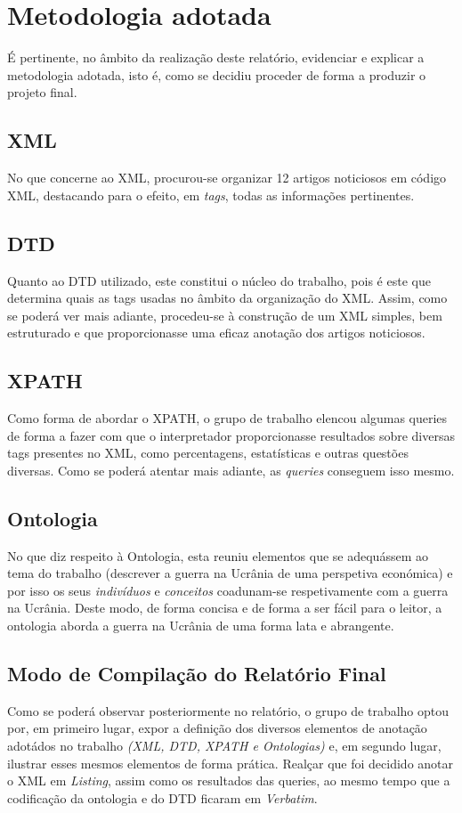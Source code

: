 \documentclass[12pt]{report}
\begin{document}
\chapter{Metodologia adotada}
É pertinente, no âmbito da realização deste relatório, evidenciar e explicar a metodologia adotada, isto é, como se decidiu proceder de forma a produzir o projeto final.

\section{XML}
No que concerne ao XML, procurou-se organizar 12 artigos noticiosos em código XML, destacando para o efeito, em \textit{tags}, todas as informações pertinentes.

\section{DTD}
Quanto ao DTD utilizado, este constitui o núcleo do trabalho, pois é este que determina quais as tags usadas no âmbito da organização do XML. Assim, como se poderá ver mais adiante, procedeu-se à construção de um XML simples, bem estruturado e que proporcionasse uma eficaz anotação dos artigos noticiosos.

\section{XPATH}
Como forma de abordar o XPATH, o grupo de trabalho elencou algumas queries de forma a fazer com que o interpretador proporcionasse resultados sobre diversas tags presentes no XML, como percentagens, estatísticas e outras questões diversas. Como se poderá atentar mais adiante, as \textit{queries} conseguem isso mesmo. 
\section{Ontologia}
No que diz respeito à Ontologia, esta reuniu elementos que se adequássem ao tema do trabalho (descrever a guerra na Ucrânia de uma perspetiva económica) e por isso os seus \textit{indivíduos} e \textit{conceitos} coadunam-se respetivamente com a guerra na Ucrânia. Deste modo, de forma concisa e de forma a ser fácil para o leitor, a ontologia aborda a guerra na Ucrânia de uma forma lata e abrangente.

\section{Modo de Compilação do Relatório Final}
Como se poderá observar posteriormente no relatório, o grupo de trabalho optou por, em primeiro lugar, expor a definição dos diversos elementos de anotação adotádos no trabalho \textit{(XML, DTD, XPATH e Ontologias)} e, em segundo lugar, ilustrar esses mesmos elementos de forma prática. Realçar que foi decidido anotar o XML em \textit{Listing}, assim como os resultados das queries, ao mesmo tempo que a codificação da ontologia e do DTD ficaram em \textit{Verbatim}.
\end{document}
